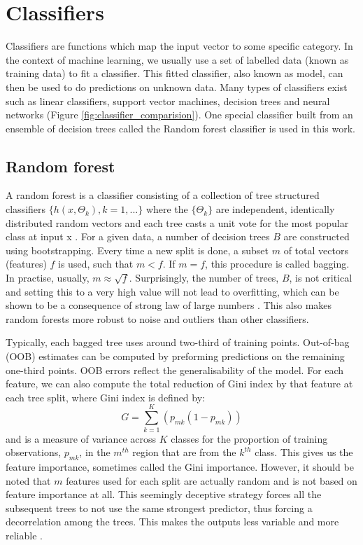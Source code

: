 \section{Classifiers}
Classifiers are functions which map the input vector to some specific category. In the context of machine learning, we usually use a set of labelled data (known as training data) to fit a classifier. This fitted classifier, also known as model, can then be used to do predictions on unknown data. Many types of classifiers exist such as linear classifiers, support vector machines, decision trees and neural networks (Figure \ref{fig:classifier_comparision}). One special classifier built from an ensemble of decision trees called the Random forest classifier is used in this work. 

\subsection{Random forest}
A random forest is a classifier consisting of a collection of tree structured classifiers $\{h(x, \Theta_k), k=1, ...\}$ where the  $\{\Theta_k\}$ are independent, identically distributed random vectors and each tree casts a unit vote for the most popular class at input {x} \cite{breiman2001random}. For a given data, a number of decision trees $B$ are constructed using bootstrapping. Every time a new split is done, a subset $m$ of total vectors (features) $f$ is used, such that $m < f$. If $m = f$, this procedure is called bagging. In practise, usually, $m \approx \sqrt{f}$. Surprisingly, the number of trees, $B$, is not critical and setting this to a very high value will not lead to overfitting, which can be shown to be a consequence of strong law of large numbers \cite{james2013introductiontostatlearning, breiman2001random}. This also makes random forests more robust to noise and outliers than other classifiers. 

Typically, each bagged tree uses around two-third of training points. Out-of-bag (OOB) estimates can be computed by preforming predictions on the remaining one-third points. OOB errors reflect the generalisability of the model. For each feature, we can also compute the total reduction of Gini index by that feature at each tree split, where Gini index is defined by: 
\begin{equation*}
    G = \sum_{k=1}^{K}(p_{mk}(1-p_{mk}))
\end{equation*}
and is a measure of variance across $K$ classes for the proportion of training observations, $p_{mk}$, in the $m^{th}$ region that are from the $k^{th}$ class. This gives us the feature importance, sometimes called the Gini importance. However, it should be noted that $m$ features used for each split are actually random and is not based on feature importance at all. This seemingly deceptive strategy forces all the subsequent trees to not use the same strongest predictor, thus forcing a decorrelation among the trees. This makes the outputs less variable and more reliable \cite{james2013introductiontostatlearning}.

